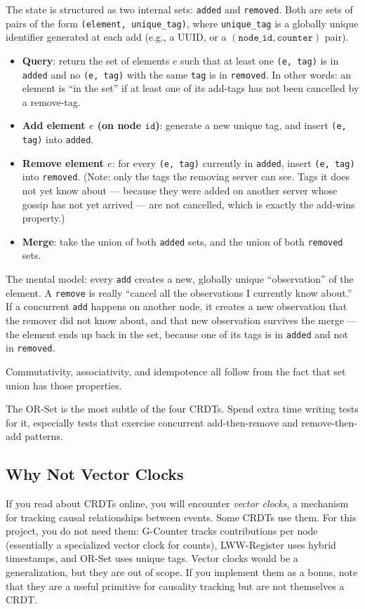 \documentclass[11pt,a4paper]{article}
\begin{document}
The state is structured as two internal sets: \texttt{added} and \texttt{removed}. Both are sets of pairs of the form \texttt{(element, unique\_tag)}, where \texttt{unique\_tag} is a globally unique identifier generated at each add (e.g., a UUID, or a $(\texttt{node\_id}, \texttt{counter})$ pair).

\begin{itemize}
\item \textbf{Query}: return the set of elements $e$ such that at least one \texttt{(e, tag)} is in \texttt{added} and no \texttt{(e, tag)} with the same \texttt{tag} is in \texttt{removed}. In other words: an element is ``in the set'' if at least one of its add-tags has not been cancelled by a remove-tag.
\item \textbf{Add element $e$ (on node $\texttt{id}$)}: generate a new unique tag, and insert \texttt{(e, tag)} into \texttt{added}.
\item \textbf{Remove element $e$}: for every \texttt{(e, tag)} currently in \texttt{added}, insert \texttt{(e, tag)} into \texttt{removed}. (Note: only the tags the removing server can see. Tags it does not yet know about --- because they were added on another server whose gossip has not yet arrived --- are not cancelled, which is exactly the add-wins property.)
\item \textbf{Merge}: take the union of both \texttt{added} sets, and the union of both \texttt{removed} sets.
\end{itemize}

The mental model: every \texttt{add} creates a new, globally unique ``observation'' of the element. A \texttt{remove} is really ``cancel all the observations I currently know about.'' If a concurrent \texttt{add} happens on another node, it creates a new observation that the remover did not know about, and that new observation survives the merge --- the element ends up back in the set, because one of its tags is in \texttt{added} and not in \texttt{removed}.

Commutativity, associativity, and idempotence all follow from the fact that set union has those properties.

The OR-Set is the most subtle of the four CRDTs. Spend extra time writing tests for it, especially tests that exercise concurrent add-then-remove and remove-then-add patterns.

\subsection{Why Not Vector Clocks}
If you read about CRDTs online, you will encounter \textit{vector clocks}, a mechanism for tracking causal relationships between events. Some CRDTs use them. For this project, you do not need them: G-Counter tracks contributions per node (essentially a specialized vector clock for counts), LWW-Register uses hybrid timestamps, and OR-Set uses unique tags. Vector clocks would be a generalization, but they are out of scope. If you implement them as a bonus, note that they are a useful primitive for causality tracking but are not themselves a CRDT.
\end{document}
